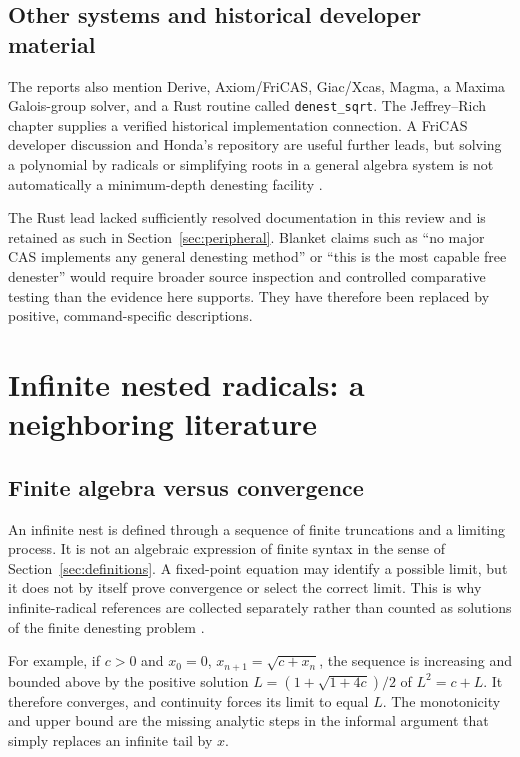 \documentclass[11pt,letterpaper]{article}
\numberwithin{equation}{section}
\theoremstyle{definition}
\theoremstyle{remark}
\begin{document}
\subsection{Other systems and historical developer material}
The reports also mention Derive, Axiom/FriCAS, Giac/Xcas, Magma, a Maxima Galois-group solver, and a Rust routine called \texttt{denest\_sqrt}. The Jeffrey--Rich chapter supplies a verified historical implementation connection. A FriCAS developer discussion and Honda's repository are useful further leads, but solving a polynomial by radicals or simplifying roots in a general algebra system is not automatically a minimum-depth denesting facility \cite{fricas,honda}.

The Rust lead lacked sufficiently resolved documentation in this review and is retained as such in Section~\ref{sec:peripheral}. Blanket claims such as ``no major CAS implements any general denesting method'' or ``this is the most capable free denester'' would require broader source inspection and controlled comparative testing than the evidence here supports. They have therefore been replaced by positive, command-specific descriptions.

\section{Infinite nested radicals: a neighboring literature}\label{sec:infinite}

\subsection{Finite algebra versus convergence}
An infinite nest is defined through a sequence of finite truncations and a limiting process. It is not an algebraic expression of finite syntax in the sense of Section~\ref{sec:definitions}. A fixed-point equation may identify a possible limit, but it does not by itself prove convergence or select the correct limit. This is why infinite-radical references are collected separately rather than counted as solutions of the finite denesting problem \cite{herschfeld,borweinradicals}.

For example, if $c>0$ and $x_0=0$, $x_{n+1}=\sqrt{c+x_n}$, the sequence is increasing and bounded above by the positive solution $L=(1+\sqrt{1+4c})/2$ of $L^2=c+L$. It therefore converges, and continuity forces its limit to equal $L$. The monotonicity and upper bound are the missing analytic steps in the informal argument that simply replaces an infinite tail by $x$.
\end{document}
